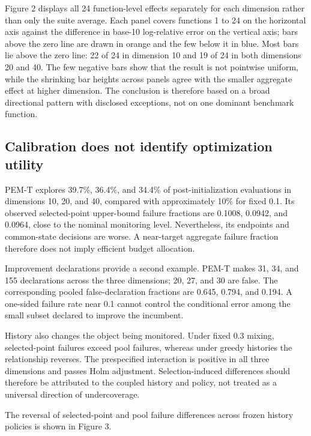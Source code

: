\documentclass[]{interact}
\begin{document}
Figure 2 displays all 24 function-level effects separately for each dimension rather than only the suite average. Each panel covers functions 1 to 24 on the horizontal axis against the difference in base-10 log-relative error on the vertical axis; bars above the zero line are drawn in orange and the few below it in blue. Most bars lie above the zero line: 22 of 24 in dimension 10 and 19 of 24 in both dimensions 20 and 40. The few negative bars show that the result is not pointwise uniform, while the shrinking bar heights across panels agree with the smaller aggregate effect at higher dimension. The conclusion is therefore based on a broad directional pattern with disclosed exceptions, not on one dominant benchmark function.

\hypertarget{calibration-does-not-identify-optimization-utility}{%
\subsection{Calibration does not identify optimization utility}\label{calibration-does-not-identify-optimization-utility}}

PEM-T explores 39.7\%, 36.4\%, and 34.4\% of post-initialization evaluations in dimensions 10, 20, and 40, compared with approximately 10\% for fixed 0.1. Its observed selected-point upper-bound failure fractions are 0.1008, 0.0942, and 0.0964, close to the nominal monitoring level. Nevertheless, its endpoints and common-state decisions are worse. A near-target aggregate failure fraction therefore does not imply efficient budget allocation.

Improvement declarations provide a second example. PEM-T makes 31, 34, and 155 declarations across the three dimensions; 20, 27, and 30 are false. The corresponding pooled false-declaration fractions are 0.645, 0.794, and 0.194. A one-sided failure rate near 0.1 cannot control the conditional error among the small subset declared to improve the incumbent.

History also changes the object being monitored. Under fixed 0.3 mixing, selected-point failures exceed pool failures, whereas under greedy histories the relationship reverses. The prespecified interaction is positive in all three dimensions and passes Holm adjustment. Selection-induced differences should therefore be attributed to the coupled history and policy, not treated as a universal direction of undercoverage.

The reversal of selected-point and pool failure differences across frozen history policies is shown in Figure 3.
\end{document}

